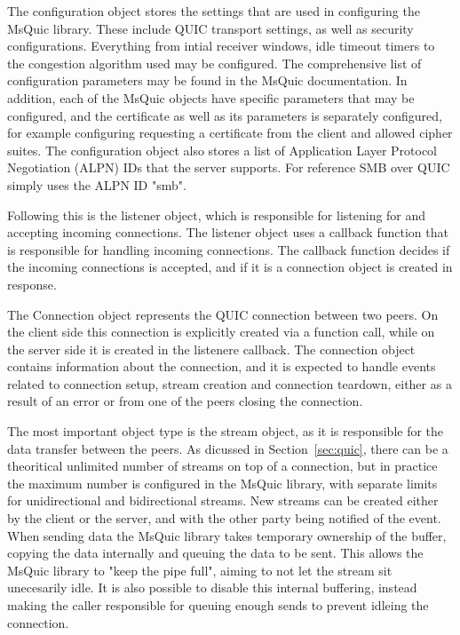 \documentclass[english, 12pt, a4paper, elec, utf8, a-2b, online]{aaltothesis}
\begin{document}
The configuration object stores the settings that are used in configuring the MsQuic
library. These include QUIC transport settings, as well as security configurations. Everything
from intial receiver windows, idle timeout timers to the congestion algorithm used
may be configured. The comprehensive list of configuration parameters may be found
in the MsQuic documentation. In addition, each of the MsQuic objects have specific
parameters that may be configured, and the certificate as well as its parameters
is separately configured, for example configuring requesting a certificate from the client
and allowed cipher suites. The configuration object also stores a list of
Application Layer Protocol Negotiation (ALPN) IDs that the server supports\cite{msquic_docs}.
For reference SMB over QUIC simply uses the ALPN ID "smb".

Following this is the listener object, which is responsible for listening for
and accepting incoming connections. The listener object uses a callback function
that is responsible for handling incoming connections. The callback function decides
if the incoming connections is accepted, and if it is a connection object is created
in response\cite{msquic_docs}.

The Connection object represents the QUIC connection between two peers. On the client
side this connection is explicitly created via a function call, while on the server
side it is created in the listenere callback. The connection object contains information
about the connection, and it is expected to handle events related to connection setup,
stream creation and connection teardown, either as a result of an error or from one
of the peers closing the connection\cite{msquic_docs}.

The most important object type is the stream object, as it is responsible for
the data transfer between the peers. As dicussed in Section~\ref{sec:quic}, there
can be a theoritical unlimited number of streams on top of a connection, but in
practice the maximum number is configured in the MsQuic library, with separate
limits for unidirectional and bidirectional streams. New streams can be created
either by the client or the server, and with the other party being notified of
the event. When sending data the MsQuic library takes temporary ownership of the
buffer, copying the data internally and queuing the data to be sent. This allows
the MsQuic library to "keep the pipe full", aiming to not let the stream sit unecesarily
idle. It is also possible to disable this internal buffering, instead making the
caller responsible for queuing enough sends to prevent idleing the connection\cite{msquic_docs}.
\end{document}
